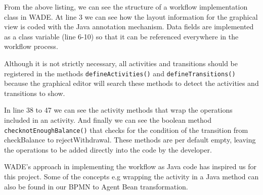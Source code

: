 From the above listing, we can see the structure of a workflow implementation class in WADE. At line 3 we can see how the layout information for the graphical view is coded with the Java annotation mechanism. Data fields are implemented as a class variable (line 6-10) so that it can be referenced everywhere in the workflow process. 

Although it is not strictly necessary, all activities and transitions should be registered in the methods \verb|defineActivities()| and \verb|defineTransitions()| because the graphical editor will search these methods to detect the activities and transitions to show.

In line 38 to 47 we can see the activity methods that wrap the operations included in an activity. And finally we can see the boolean method  \verb|checknotEnoughBalance()| that checks for the condition of the transition from checkBalance to rejectWithdrawal. These methods are per default empty, leaving the operations to be added directly into the code by the developer.

WADE's approach in implementing the workflow as Java code has inspired us for this project. Some of the concepts e.g wrapping the activity in a Java method can also be found in our BPMN to Agent Bean transformation. 